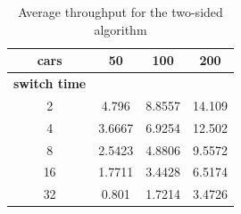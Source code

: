 \documentclass[a4paper,11pt]{article}
\begin{document}
\begin{table}[htb]
\centering
\begin{tabular}{cccc}
\hline
\textbf{cars} & 50 & 100 & 200\\
\hline
\textbf{switch time} & & & \\
2 & 4.796 & 8.8557 & 14.109 \\
4 & 3.6667 & 6.9254 & 12.502 \\
8 & 2.5423 & 4.8806 & 9.5572 \\
16 & 1.7711 & 3.4428 & 6.5174 \\
32 & 0.801 & 1.7214 & 3.4726 \\
\hline
\end{tabular}
\label{tab:twocars}
\caption{Average throughput for the two-sided algorithm}
\end{table}
\end{document}
